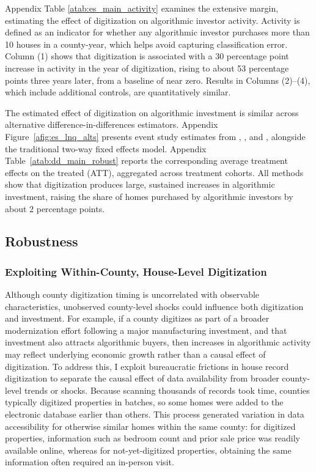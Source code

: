 \documentclass[11pt]{article}
\begin{document}
Appendix Table \ref{atab:es_main_activity} examines the extensive margin, estimating the effect of digitization on algorithmic investor activity. Activity is defined as an indicator for whether any algorithmic investor purchases more than 10 houses in a county-year, which helps avoid capturing classification error. Column (1) shows that digitization is associated with a 30 percentage point increase in activity in the year of digitization, rising to about 53 percentage points three years later, from a baseline of near zero. Results in Columns (2)--(4), which include additional controls, are quantitatively similar.


The estimated effect of digitization on algorithmic investment is similar across alternative difference-in-differences estimators. Appendix Figure~\ref{afig:es_lnq_alts} presents event study estimates from  \citet{borusyak2022revisiting}, \citet{sun_estimating_2020}, and \citet{callaway_2021}, alongside the traditional two-way fixed effects model. Appendix Table~\ref{atab:dd_main_robust} reports the corresponding average treatment effects on the treated (ATT), aggregated across treatment cohorts. All methods show that digitization produces large, sustained increases in algorithmic investment, raising the share of homes purchased by algorithmic investors by about 2 percentage points. 


\subsection{Robustness}

\subsubsection{Exploiting Within-County, House-Level Digitization} \label{sec:diffrobustness}
Although county digitization timing is uncorrelated with observable characteristics, unobserved county-level shocks could influence both digitization and investment. For example, if a county digitizes as part of a broader modernization effort following a major manufacturing investment, and that investment also attracts algorithmic buyers, then increases in algorithmic activity may reflect underlying economic growth rather than a causal effect of digitization.  To address this, I exploit bureaucratic frictions in house record digitization to separate the causal effect of data availability from broader county-level trends or shocks. Because scanning thousands of records took time, counties typically digitized properties in batches, so some homes were added to the electronic database earlier than others. This process generated variation in data accessibility for otherwise similar homes within the same county: for digitized properties, information such as bedroom count and prior sale price was readily available online, whereas for not-yet-digitized properties, obtaining the same information often required an in-person visit.
\end{document}
